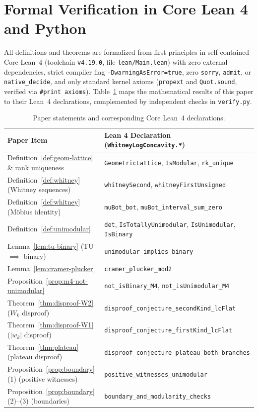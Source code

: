 \documentclass[11pt]{article}
\theoremstyle{definition}
\theoremstyle{remark}
\begin{document}
\section{Formal Verification in Core Lean 4 and Python}

All definitions and theorems are formalized from first principles in self-contained Core Lean~4
(toolchain \texttt{v4.19.0}, file \texttt{lean/Main.lean}) with zero external dependencies, strict
compiler flag \texttt{-DwarningAsError=true}, zero \texttt{sorry}, \texttt{admit}, or
\texttt{native\_decide}, and only standard kernel axioms (\texttt{propext} and \texttt{Quot.sound},
verified via \texttt{\#print axioms}). Table~\ref{tab:lean-map} maps the mathematical results of
this paper to their Lean~4 declarations, complemented by independent checks in \texttt{verify.py}.

\begin{table}[htbp]
\centering
\footnotesize
\renewcommand{\arraystretch}{1.2}
\caption{Paper statements and corresponding Core Lean~4 declarations.}
\label{tab:lean-map}
\begin{tabular}{ll}
\hline
Paper Item & Lean 4 Declaration (\texttt{WhitneyLogConcavity.*}) \\
\hline
Definition~\ref{def:geom-lattice} \& rank uniqueness & \texttt{GeometricLattice}, \texttt{IsModular}, \texttt{rk\_unique} \\
Definition~\ref{def:whitney} (Whitney sequences) & \texttt{whitneySecond}, \texttt{whitneyFirstUnsigned} \\
Definition~\ref{def:whitney} (M\"obius identity) & \texttt{muBot\_bot}, \texttt{muBot\_interval\_sum\_zero} \\
Definition~\ref{def:unimodular} & \texttt{det}, \texttt{IsTotallyUnimodular}, \texttt{IsUnimodular}, \texttt{IsBinary} \\
Lemma~\ref{lem:tu-binary} (TU $\implies$ binary) & \texttt{unimodular\_implies\_binary} \\
Lemma~\ref{lem:cramer-plucker} & \texttt{cramer\_plucker\_mod2} \\
Proposition~\ref{prop:m4-not-unimodular} & \texttt{not\_isBinary\_M4}, \texttt{not\_isUnimodular\_M4} \\
Theorem~\ref{thm:disproof-W2} ($W_k$ disproof) & \texttt{disproof\_conjecture\_secondKind\_lcFlat} \\
Theorem~\ref{thm:disproof-W1} ($|w_k|$ disproof) & \texttt{disproof\_conjecture\_firstKind\_lcFlat} \\
Theorem~\ref{thm:plateau} (plateau disproof) & \texttt{disproof\_conjecture\_plateau\_both\_branches} \\
Proposition~\ref{prop:boundary}(1) (positive witnesses) & \texttt{positive\_witnesses\_unimodular} \\
Proposition~\ref{prop:boundary}(2)--(3) (boundaries) & \texttt{boundary\_and\_modularity\_checks} \\
\hline
\end{tabular}
\end{table}
\end{document}
